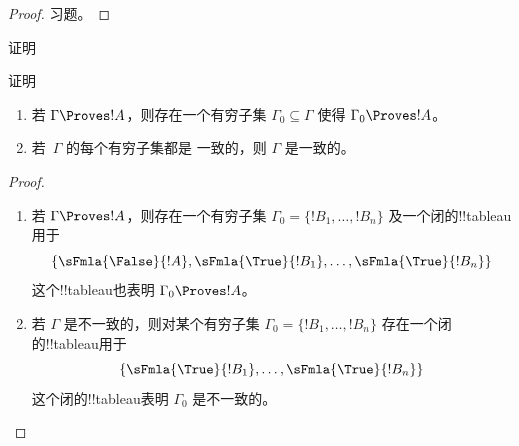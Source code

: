 \documentclass[../../../include/open-logic-section]{subfiles}
\begin{document}
\begin{proof}
习题。
\end{proof}

\begin{prob}
证明 
\end{prob}
\tagendprob

\begin{prob}
证明 
\end{prob}
\tagendprob

\begin{prop}[紧致性]
  \begin{enumerate}
  \item 若 $\Gamma \Proves !A$，则存在一个有穷子集 $\Gamma_0
    \subseteq \Gamma$ 使得 $\Gamma_0 \Proves !A$。
  \item 若~$\Gamma$ 的每个有穷子集都是
    一致的，则 $\Gamma$ 是一致的。
  \end{enumerate}
\end{prop}

\begin{proof}
  \begin{enumerate}
    \item 若 $\Gamma \Proves !A$，则存在一个有穷子集
      $\Gamma_0 = \{!B_1, \dots, !B_n\}$ 及一个闭的!!{tableau}用于
      \[
      \{\sFmla{\False}{!A}, \sFmla{\True}{!B_1}, \dots, \sFmla{\True}{!B_n}\}
      \]
      这个!!{tableau}也表明 $\Gamma_0 \Proves !A$。
    \item 若 $\Gamma$ 是不一致的，则对某个有穷子集
      $\Gamma_0 = \{!B_1, \dots, !B_n\}$ 存在一个闭的!!{tableau}用于
      \[
      \{\sFmla{\True}{!B_1}, \dots, \sFmla{\True}{!B_n}\}
      \]
      这个闭的!!{tableau}表明 $\Gamma_0$ 是不一致的。
  \end{enumerate}
\end{proof}
\end{document}
